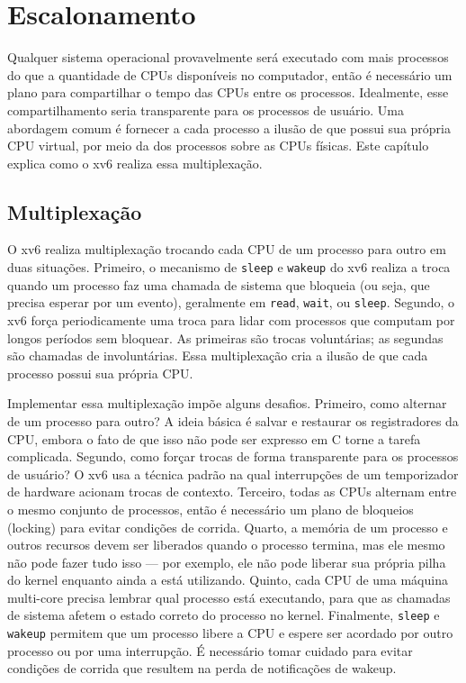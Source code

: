 % 
%  
\chapter{Escalonamento}
\label{CH:SCHED}

Qualquer sistema operacional provavelmente será executado com mais processos do que a quantidade de CPUs disponíveis no computador, então é necessário um plano para compartilhar o tempo das CPUs entre os processos. Idealmente, esse compartilhamento seria transparente para os processos de usuário. Uma abordagem comum é fornecer a cada processo a ilusão de que possui sua própria CPU virtual, por meio da
dos processos sobre as CPUs físicas.
Este capítulo explica como o xv6 realiza essa multiplexação.

\section{Multiplexação}

O xv6 realiza multiplexação trocando cada CPU de um processo para outro em duas situações. Primeiro, o mecanismo de
\lstinline{sleep}
e
\lstinline{wakeup}
do xv6 realiza a troca quando um processo faz uma chamada de sistema que bloqueia (ou seja, que precisa esperar por um evento), geralmente em
\lstinline{read},
\lstinline{wait},
ou
\lstinline{sleep}.
Segundo, o xv6 força periodicamente uma troca para lidar com processos que computam por longos períodos sem bloquear.
As primeiras são trocas voluntárias;
as segundas são chamadas de involuntárias.
Essa multiplexação cria a ilusão de que cada processo possui sua própria CPU.

Implementar essa multiplexação impõe alguns desafios. Primeiro, como alternar de um processo para outro?
A ideia básica é salvar e restaurar os registradores da CPU, embora o fato de que isso não pode ser expresso em C torne a tarefa complicada.
Segundo, como forçar trocas de forma transparente para os processos de usuário? O xv6 usa a técnica padrão na qual interrupções de um temporizador de hardware acionam trocas de contexto.
Terceiro, todas as CPUs alternam entre o mesmo conjunto de processos, então é necessário um plano de bloqueios (locking) para evitar condições de corrida.
Quarto, a memória de um processo e outros recursos devem ser liberados quando o processo termina, mas ele mesmo não pode fazer tudo isso — por exemplo, ele não pode liberar sua própria pilha do kernel enquanto ainda a está utilizando.
Quinto, cada CPU de uma máquina multi-core precisa lembrar qual processo está executando, para que as chamadas de sistema afetem o estado correto do processo no kernel.
Finalmente,
\lstinline{sleep}
e
\lstinline{wakeup}
permitem que um processo libere a CPU e espere ser acordado por outro processo ou por uma interrupção.
É necessário tomar cuidado para evitar condições de corrida que resultem na perda de notificações de wakeup.

